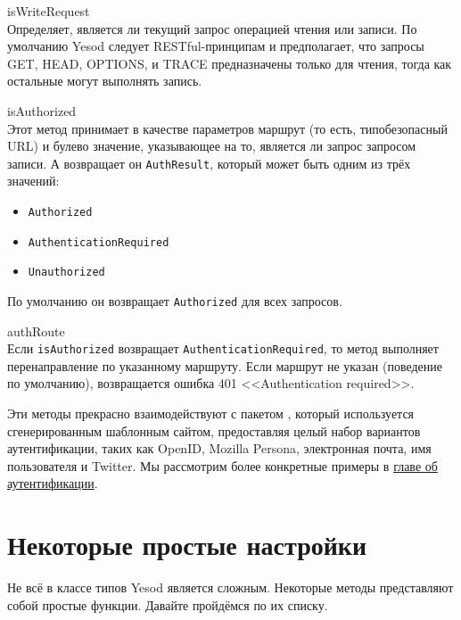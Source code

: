 \begin{description}
  \item {isWriteRequest} \hfill \\
    Определяет, является ли текущий запрос операцией чтения или записи. По
    умолчанию Yesod следует RESTful-принципам и предполагает, что запросы GET,
    HEAD, OPTIONS, и TRACE предназначены только для чтения, тогда как остальные
    могут выполнять запись.

  \item {isAuthorized} \hfill \\
    Этот метод принимает в качестве параметров маршрут (то есть, типобезопасный
    URL) и булево значение, указывающее на то, является ли запрос запросом
    записи. А возвращает он \lstinline!AuthResult!, который может быть одним из
    трёх значений:
    \begin{itemize}
      \item \lstinline!Authorized!
      \item \lstinline!AuthenticationRequired!
      \item \lstinline!Unauthorized!
    \end{itemize}
    По умолчанию он возвращает \lstinline!Authorized! для всех запросов.

  \item {authRoute} \hfill \\
    Если \lstinline!isAuthorized! возвращает
    \lstinline!AuthenticationRequired!, то метод выполняет перенаправление по
    указанному маршруту. Если маршрут не указан (поведение по умолчанию),
    возвращается ошибка 401 <<Authentication required>>.
\end{description}

Эти методы прекрасно взаимодействуют с пакетом
,
который используется сгенерированным шаблонным сайтом, предоставляя целый набор
вариантов аутентификации, таких как OpenID, Mozilla Persona, электронная почта, имя
пользователя и Twitter. Мы рассмотрим более конкретные примеры в
\hyperref[chap:auth]{главе об аутентификации}.

\section {Некоторые простые настройки}

Не всё в классе типов Yesod является сложным. Некоторые методы представляют
собой простые функции. Давайте пройдёмся по их списку.

